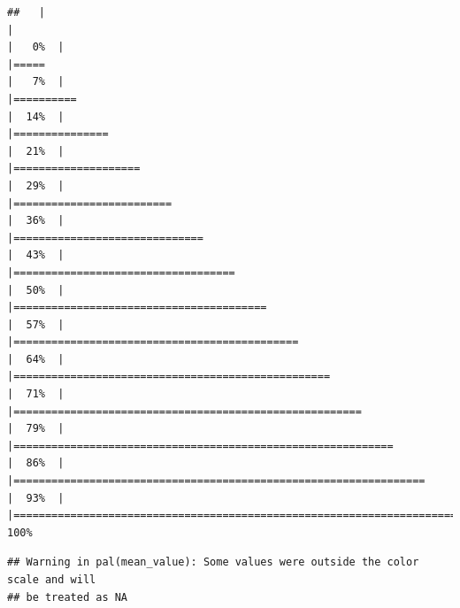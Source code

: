 \documentclass[
]{book}
\begin{document}
\begin{verbatim}
##   |                                                                              |                                                                      |   0%  |                                                                              |=====                                                                 |   7%  |                                                                              |==========                                                            |  14%  |                                                                              |===============                                                       |  21%  |                                                                              |====================                                                  |  29%  |                                                                              |=========================                                             |  36%  |                                                                              |==============================                                        |  43%  |                                                                              |===================================                                   |  50%  |                                                                              |========================================                              |  57%  |                                                                              |=============================================                         |  64%  |                                                                              |==================================================                    |  71%  |                                                                              |=======================================================               |  79%  |                                                                              |============================================================          |  86%  |                                                                              |=================================================================     |  93%  |                                                                              |======================================================================| 100%
\end{verbatim}

\begin{verbatim}
## Warning in pal(mean_value): Some values were outside the color scale and will
## be treated as NA
\end{verbatim}
\end{document}

